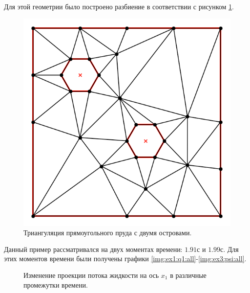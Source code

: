 \documentclass[14pt]{extreport}
\begin{document}
Для этой геометрии было построено разбиение в соответствии с рисунком \ref{img:ex3:mesh}.

\begin{figure}[H]
\centerline{
\includegraphics[width=0.5\linewidth]{images/ex3/mesh}}
\caption{Триангуляция прямоугольного пруда с двумя островами.}
\label{img:ex3:mesh}
\end{figure}

Данный пример рассматривался на двух моментах времени: $1.91$с и $1.99$с. Для этих моментов времени были получены графики \ref{img:ex1:q1:all}-\ref{img:ex3:psi:all}.

\begin{figure}[H]
  \centering
  \hfill
  \caption{Изменение проекции потока жидкости на ось $x_1$ в различные промежутки времени.}
  \label{img:ex3:q1:all}
\end{figure}
\end{document}
